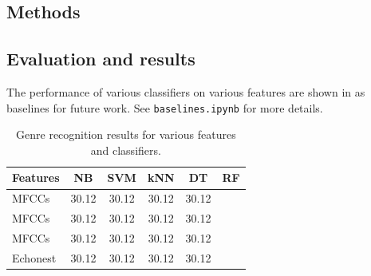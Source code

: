 \documentclass{article}
\begin{document}
\subsection{Methods}

\subsection{Evaluation and results}

The performance of various classifiers on various features are shown in  as baselines for future work.
See \texttt{baselines.ipynb} for more details.

\begin{table}
	\centering
	\begin{tabular}{lccccc}
		\toprule
		Features & NB & SVM & kNN & DT & RF \\
		\midrule
		MFCCs  & 30.12 & 30.12 & 30.12 & 30.12 \\
		MFCCs  & 30.12 & 30.12 & 30.12 & 30.12 \\
		MFCCs  & 30.12 & 30.12 & 30.12 & 30.12 \\
		Echonest  & 30.12 & 30.12 & 30.12 & 30.12 \\
		\bottomrule
	\end{tabular}
	\caption{Genre recognition results for various features and classifiers.}
	\label{tab:mgr}
\end{table}

%
%
\end{document}
